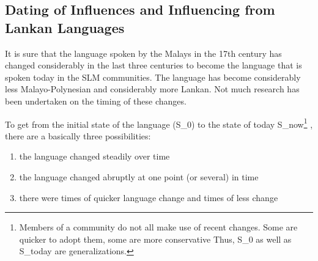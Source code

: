 %
%



\subsection{Dating of Influences and Influencing from Lankan Languages}\label{sec:slmbg:DatingofInfluencesandInfluencingfromLankanLanguages}
It is sure that the language spoken by the Malays in the 17th century has changed considerably in the last three centuries to become the language that is spoken today in the SLM communities. The language has become considerably less Malayo-Polynesian and considerably more Lankan. Not much research has been undertaken on  the timing of these changes.

To get from the initial state of the language (S_0) to  the state of today S_{now}\footnote{Members of a community do not all make use of recent changes. Some are    quicker to adopt them, some are more conservative %
Thus, S_0 as well as S_{today} are generalizations.}
, there are a basically three possibilities:
\begin{enumerate}
        \item the language changed steadily over time
        \item the language changed abruptly at one point (or several) in time
    \item there were times of quicker language change and times of less change
\end{enumerate}

